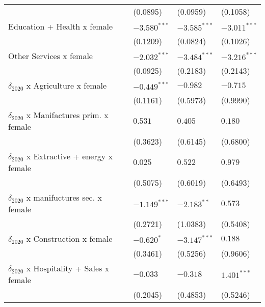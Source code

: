 \begin{tabular}{llll}
                                                   &           (0.0895) &           (0.0959) &           (0.1058) \\
Education + Health x female                        &     $-3.580^{***}$ &     $-3.585^{***}$ &     $-3.011^{***}$ \\
                                                   &           (0.1209) &           (0.0824) &           (0.1026) \\
Other Services x female                            &     $-2.032^{***}$ &     $-3.484^{***}$ &     $-3.216^{***}$ \\
                                                   &           (0.0925) &           (0.2183) &           (0.2143) \\
$\delta_{2020}$ x Agriculture x female             &     $-0.449^{***}$ &           $-0.982$ &           $-0.715$ \\
                                                   &           (0.1161) &           (0.5973) &           (0.9990) \\
$\delta_{2020}$ x Manifactures prim. x female      &            $0.531$ &            $0.405$ &            $0.180$ \\
                                                   &           (0.3623) &           (0.6145) &           (0.6800) \\
$\delta_{2020}$ x Extractive + energy x female     &            $0.025$ &            $0.522$ &            $0.979$ \\
                                                   &           (0.5075) &           (0.6019) &           (0.6493) \\
$\delta_{2020}$ x manifuctures sec. x female       &     $-1.149^{***}$ &      $-2.183^{**}$ &            $0.573$ \\
                                                   &           (0.2721) &           (1.0383) &           (0.5408) \\
$\delta_{2020}$ x Construction x female            &         $-0.620^*$ &     $-3.147^{***}$ &            $0.188$ \\
                                                   &           (0.3461) &           (0.5256) &           (0.9606) \\
$\delta_{2020}$ x Hospitality + Sales x female     &           $-0.033$ &           $-0.318$ &      $1.401^{***}$ \\
                                                   &           (0.2045) &           (0.4853) &           (0.5246) \\

\end{tabular}
